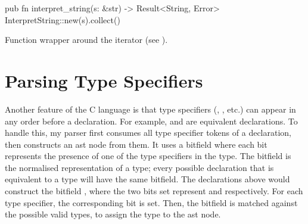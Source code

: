 \documentclass[../00-main.tex]{subfiles}
\begin{document}
\begin{listing}[t]
  \begin{RustListing}
    pub fn interpret_string(s: &str) -> Result<String, Error> {
        InterpretString::new(s).collect()
    }
  \end{RustListing}
  \caption{Function wrapper around the  iterator (see ).}
  \label{app:lst:interpret string function}
\end{listing}


\section{Parsing Type Specifiers}

Another feature of the C language is that type specifiers (, , etc.) can appear in any order before a declaration.
For example,  and  are equivalent declarations.
To handle this, my parser first consumes all type specifier tokens of a declaration, then constructs an  \gls{ast} node from them.
It uses a bitfield where each bit represents the presence of one of the type specifiers in the type.
The bitfield is the normalised representation of a type; every possible declaration that is equivalent to a type will have the same bitfield.
The declarations above would construct the bitfield , where the two bits set represent  and  respectively.
For each type specifier, the corresponding bit is set.
Then, the bitfield is matched against the possible valid types, to assign the type to the \gls{ast} node.
\end{document}
